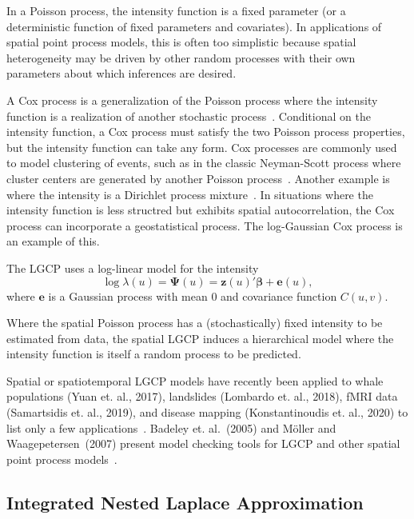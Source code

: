 \documentclass[]{interact}
\begin{document}
In a Poisson process, the intensity function is a fixed parameter (or a
deterministic function of fixed parameters and covariates). In applications of
spatial point process models, this is often too simplistic because spatial
heterogeneity may be driven by other random processes with their own parameters
about which inferences are desired.

A Cox process is a generalization of the Poisson process where the intensity
function is a realization of another stochastic process~\cite{cox,digglepoint}.
Conditional on the intensity function, a Cox process must satisfy the two
Poisson process properties, but the intensity function can take any form. Cox
processes are commonly used to model clustering of events, such as in the
classic Neyman-Scott process where cluster centers are generated by another
Poisson process~\cite{neymanscott}. Another example is where the intensity is
a Dirichlet process mixture~\cite{taddy}. In situations where the intensity
function is less structred but exhibits spatial autocorrelation, the Cox
process can incorporate a geostatistical process. The log-Gaussian Cox process
is an example of this.

The LGCP uses a log-linear model for the intensity
\begin{displaymath}
\log\lambda(u) = \boldsymbol{\Psi}(u)
= \mathbf{z}(u)' \boldsymbol{\beta} + \mathbf{e}(u),
\end{displaymath}
where \(\mathbf{e}\) is a Gaussian process with mean 0 and covariance function
\(C(u, v)\).

Where the spatial Poisson process has a (stochastically) fixed intensity to be
estimated from data, the spatial LGCP induces a hierarchical model where the
intensity function is itself a random process to be predicted.

Spatial or spatiotemporal LGCP models have recently been applied to whale
populations (Yuan et. al., 2017), landslides (Lombardo et. al., 2018), fMRI
data (Samartsidis et. al., 2019), and disease mapping (Konstantinoudis et.
al., 2020) to list only a few
applications~\cite{yuanetal,lombardoetal,samartsidisetal,konstantinoudisetal}.
Badeley et. al.~(2005) and M\"{o}ller and Waagepetersen~(2007) present model
checking tools for LGCP and other spatial point process
models~\cite{baddeleyresiduals,moellerwaagepetersen}.


\subsection{Integrated Nested Laplace Approximation}
\label{inla}
\end{document}
